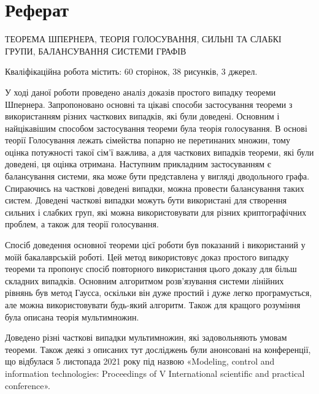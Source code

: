 \chapter*{Реферат}

\MakeUppercase{Теорема Шпернера, теорія голосування, сильні та слабкі групи, балансування системи графів}

Кваліфікаційна робота містить: 60 сторінок, 38 рисунків, 3 джерел.

У ході даної роботи проведено аналіз доказів простого випадку теореми Шпернера. Запропоновано основні та цікаві способи застосування теореми з використанням різних часткових випадків, які були доведені. Основним і найцікавішим способом застосування теореми була теорія голосування. В основі теорії Голосування лежать сімейства попарно не перетинаних множин, тому оцінка потужності такої сім'ї важлива, а для часткових випадків теореми, які були доведені, ця оцінка отримана. Наступним прикладним застосуванням є балансування системи, яка може бути представлена ​​у вигляді дводольного графа. Спираючись на часткові доведені випадки, можна провести балансування таких систем. Доведені часткові випадки можуть бути використані для створення сильних і слабких груп, які можна використовувати для різних криптографічних проблем, а також для теорії голосування.

Спосіб доведення основної теореми цієї роботи був показаний і використаний у моїй бакалаврській роботі. Цей метод використовує доказ простого випадку теореми та пропонує спосіб повторного використання цього доказу для більш складних випадків. Основним алгоритмом розв’язування системи лінійних рівнянь був метод Гаусса, оскільки він дуже простий і дуже легко програмується, але можна використовувати будь-який алгоритм. Також для кращого розуміння була описана теорія мультимножин.

Доведено різні часткові випадки мультимножин, які задовольняють умовам теореми. Також деякі з описаних тут досліджень були анонсовані на конференції, що відбулася 5 листопада 2021 року під назвою «Modeling, control and information technologies: Proceedings of V International scientific and practical conference».